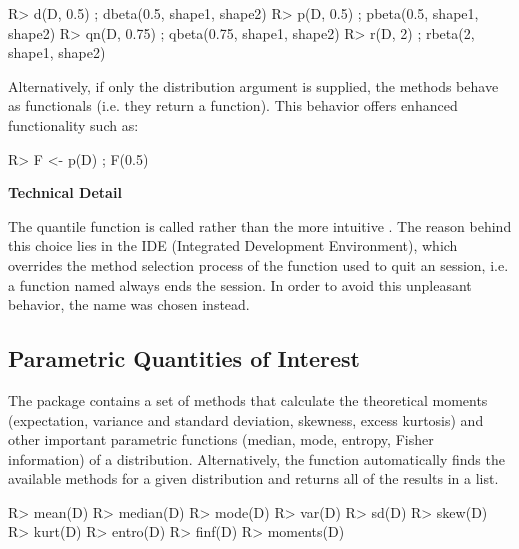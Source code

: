 \documentclass[nojss]{jss}
\newcommand{\fct}[1]{\code{#1()}}
\begin{document}
\begin{CodeChunk}
\begin{CodeInput}
R> d(D, 0.5) ; dbeta(0.5, shape1, shape2)
R> p(D, 0.5) ; pbeta(0.5, shape1, shape2)
R> qn(D, 0.75) ; qbeta(0.75, shape1, shape2)
R> r(D, 2) ; rbeta(2, shape1, shape2)
\end{CodeInput}
\end{CodeChunk}

Alternatively, if only the distribution argument is supplied, the methods behave as functionals (i.e. they return a function). This behavior offers enhanced functionality such as:

\begin{CodeChunk}
\begin{CodeInput}
R> F <- p(D) ; F(0.5)
\end{CodeInput}
\end{CodeChunk}

\begin{leftbar}
\textbf{Technical Detail}

The quantile function is called \fct{qn} rather than the more intuitive \fct{q}. The reason behind this choice lies in the  IDE (Integrated Development Environment), which overrides the method selection process of the  function \fct{q} used to quit an  session, i.e. a function named \fct{q} always ends the session. In order to avoid this unpleasant behavior, the name \fct{qn} was chosen instead.
\end{leftbar}

\subsection[Parametric Quantities of Interest]{Parametric Quantities of Interest} \label{ss:moments}

The  package contains a set of methods that calculate the theoretical moments (expectation, variance and standard deviation, skewness, excess kurtosis) and other important parametric functions (median, mode, entropy, Fisher information) of a distribution. Alternatively, the \fct{moments} function automatically finds the available methods for a given distribution and returns all of the results in a list.

\begin{CodeChunk}
\begin{CodeInput}
R> mean(D)
R> median(D)
R> mode(D)
R> var(D)
R> sd(D)
R> skew(D)
R> kurt(D)
R> entro(D)
R> finf(D)
R> moments(D)
\end{CodeInput}
\end{CodeChunk}
\end{document}
